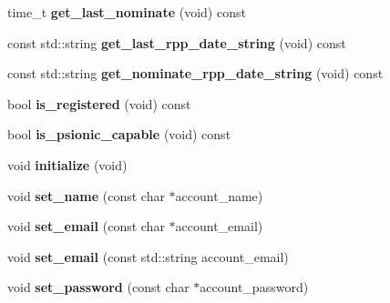 \begin{DoxyCompactItemize}
\item 
\hypertarget{classaccount_ac7207c93ae1ceb659166c113a0950907}{time\-\_\-t {\bfseries get\-\_\-last\-\_\-nominate} (void) const }\label{classaccount_ac7207c93ae1ceb659166c113a0950907}

\item 
\hypertarget{classaccount_ae31cdc39d0e78b6e745b049f7557560d}{const std\-::string {\bfseries get\-\_\-last\-\_\-rpp\-\_\-date\-\_\-string} (void) const }\label{classaccount_ae31cdc39d0e78b6e745b049f7557560d}

\item 
\hypertarget{classaccount_a86bd584f41fc85cdf6b5c08f5d646bae}{const std\-::string {\bfseries get\-\_\-nominate\-\_\-rpp\-\_\-date\-\_\-string} (void) const }\label{classaccount_a86bd584f41fc85cdf6b5c08f5d646bae}

\item 
\hypertarget{classaccount_aca26766792b246602bae438cbeca3428}{bool {\bfseries is\-\_\-registered} (void) const }\label{classaccount_aca26766792b246602bae438cbeca3428}

\item 
\hypertarget{classaccount_a64fd2bc0153983a53c19950b88cdc7a7}{bool {\bfseries is\-\_\-psionic\-\_\-capable} (void) const }\label{classaccount_a64fd2bc0153983a53c19950b88cdc7a7}

\item 
\hypertarget{classaccount_a84b9499eb811cc859ecd1825906b6b49}{void {\bfseries initialize} (void)}\label{classaccount_a84b9499eb811cc859ecd1825906b6b49}

\item 
\hypertarget{classaccount_ab8ddeefc071a39f28a778c7e353c22e2}{void {\bfseries set\-\_\-name} (const char $\ast$account\-\_\-name)}\label{classaccount_ab8ddeefc071a39f28a778c7e353c22e2}

\item 
\hypertarget{classaccount_a055dd7ec6b8b20d6a25ba99e8a756162}{void {\bfseries set\-\_\-email} (const char $\ast$account\-\_\-email)}\label{classaccount_a055dd7ec6b8b20d6a25ba99e8a756162}

\item 
\hypertarget{classaccount_a6c387f44d3f77c3261c88346417940e0}{void {\bfseries set\-\_\-email} (const std\-::string account\-\_\-email)}\label{classaccount_a6c387f44d3f77c3261c88346417940e0}

\item 
\hypertarget{classaccount_a24a3091030b376ed6ce5e9191f6869d0}{void {\bfseries set\-\_\-password} (const char $\ast$account\-\_\-password)}\label{classaccount_a24a3091030b376ed6ce5e9191f6869d0}


\end{DoxyCompactItemize}

